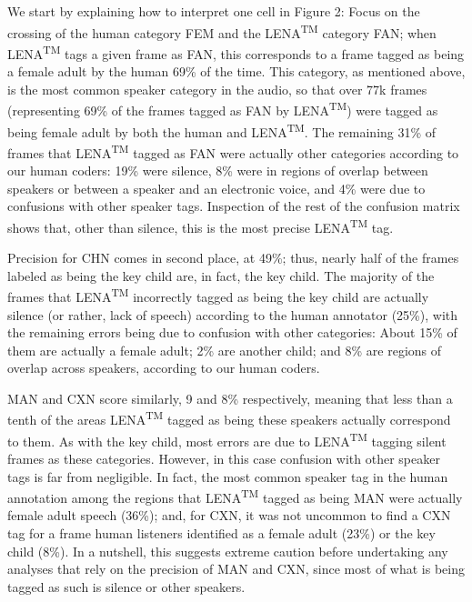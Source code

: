 \documentclass[english,floatsintext,man]{apa6}
\begin{document}
We start by explaining how to interpret one cell in Figure 2: Focus on
the crossing of the human category FEM and the LENA\textsuperscript{TM}
category FAN; when LENA\textsuperscript{TM} tags a given frame as FAN,
this corresponds to a frame tagged as being a female adult by the human
69\% of the time. This category, as mentioned above, is the most common
speaker category in the audio, so that over 77k frames (representing
69\% of the frames tagged as FAN by LENA\textsuperscript{TM}) were
tagged as being female adult by both the human and
LENA\textsuperscript{TM}. The remaining 31\% of frames that
LENA\textsuperscript{TM} tagged as FAN were actually other categories
according to our human coders: 19\% were silence, 8\% were in regions of
overlap between speakers or between a speaker and an electronic voice,
and 4\% were due to confusions with other speaker tags. Inspection of
the rest of the confusion matrix shows that, other than silence, this is
the most precise LENA\textsuperscript{TM} tag.

Precision for CHN comes in second place, at 49\%; thus, nearly half of
the frames labeled as being the key child are, in fact, the key child.
The majority of the frames that LENA\textsuperscript{TM} incorrectly
tagged as being the key child are actually silence (or rather, lack of
speech) according to the human annotator (25\%), with the remaining
errors being due to confusion with other categories: About 15\% of them
are actually a female adult; 2\% are another child; and 8\% are regions
of overlap across speakers, according to our human coders.

MAN and CXN score similarly, 9 and 8\% respectively, meaning that less
than a tenth of the areas LENA\textsuperscript{TM} tagged as being these
speakers actually correspond to them. As with the key child, most errors
are due to LENA\textsuperscript{TM} tagging silent frames as these
categories. However, in this case confusion with other speaker tags is
far from negligible. In fact, the most common speaker tag in the human
annotation among the regions that LENA\textsuperscript{TM} tagged as
being MAN were actually female adult speech (36\%); and, for CXN, it was
not uncommon to find a CXN tag for a frame human listeners identified as
a female adult (23\%) or the key child (8\%). In a nutshell, this
suggests extreme caution before undertaking any analyses that rely on
the precision of MAN and CXN, since most of what is being tagged as such
is silence or other speakers.
\end{document}
